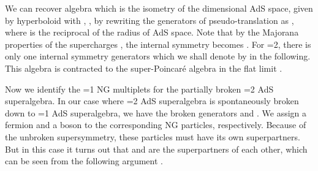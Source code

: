 \documentclass[a4paper,12pt]{article}
\begin{document}
We can recover \coordHE{} algebra which is the isometry
of the \coordHE{} dimensional AdS space, given by hyperboloid 
\coordHE{} with \coordHE{} ,
\coordHE{},
by rewriting 
the generators of pseudo-translation \coordHE{} as
 \coordHE{}, where \coordHE{} is the reciprocal 
of the radius of AdS space.
Note that by the Majorana properties of the supercharges \coordHE{},
the internal symmetry becomes \coordHE{}. 
For \coordHE{}=2, there is only one internal symmetry generators 
\coordHE{} which we shall denote by \coordHE{} in the following.
This algebra is contracted to
the super-Poincar{\' e} algebra in the flat limit \coordHE{}.

\newpage

\vspace{0.1cm}
\vspace{0.1cm}

Now we identify the \coordHE{}=1 NG multiplets for the 
partially broken \coordHE{}=2 AdS superalgebra.
In our case where \coordHE{}=2 AdS superalgebra is spontaneously broken 
down to \coordHE{}=1 AdS superalgebra, we have the broken generators
 \coordHE{} and \coordHE{}. 
We assign a fermion \myHighlight{$\psi_{\alpha}$}\coordHE{} and a boson \myHighlight{$\phi$}\coordHE{} 
to the corresponding NG particles, respectively.
Because of the unbroken \coordHE{} supersymmetry, these particles
must have its own superpartners. 
But in this case 
it turns out that \myHighlight{$\psi$}\coordHE{} and \myHighlight{$\phi$}\coordHE{} 
are the superpartners of each other, which can be seen from
the following argument \cite{KU,GU}.
\end{document}
